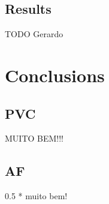 \documentclass[a4paper,titlepage]{article}
\begin{document}
\subsection{Results}
TODO Gerardo

\section{Conclusions}

\subsection{PVC}
MUITO BEM!!!

\subsection{AF}
0.5 * muito bem!
\end{document}

